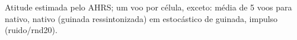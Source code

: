 Atitude estimada pelo AHRS; um voo por célula, exceto: média de 5 voos para nativo, nativo (guinada ressintonizada) em estocástico de guinada, impulso (ruido/rnd20).
